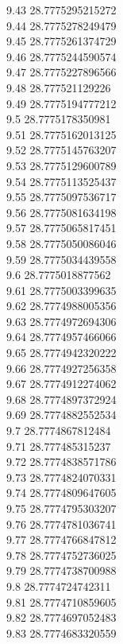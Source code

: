 {9.43	28.7775295215272\\
9.44	28.7775278249479\\
9.45	28.7775261374729\\
9.46	28.7775244590574\\
9.47	28.7775227896566\\
9.48	28.777521129226\\
9.49	28.7775194777212\\
9.5	28.7775178350981\\
9.51	28.7775162013125\\
9.52	28.7775145763207\\
9.53	28.7775129600789\\
9.54	28.7775113525437\\
9.55	28.7775097536717\\
9.56	28.7775081634198\\
9.57	28.7775065817451\\
9.58	28.7775050086046\\
9.59	28.7775034439558\\
9.6	28.7775018877562\\
9.61	28.7775003399635\\
9.62	28.7774988005356\\
9.63	28.7774972694306\\
9.64	28.7774957466066\\
9.65	28.7774942320222\\
9.66	28.7774927256358\\
9.67	28.7774912274062\\
9.68	28.7774897372924\\
9.69	28.7774882552534\\
9.7	28.7774867812484\\
9.71	28.777485315237\\
9.72	28.7774838571786\\
9.73	28.7774824070331\\
9.74	28.7774809647605\\
9.75	28.7774795303207\\
9.76	28.7774781036741\\
9.77	28.7774766847812\\
9.78	28.7774752736025\\
9.79	28.7774738700988\\
9.8	28.7774724742311\\
9.81	28.7774710859605\\
9.82	28.7774697052483\\
9.83	28.7774683320559\\
}
